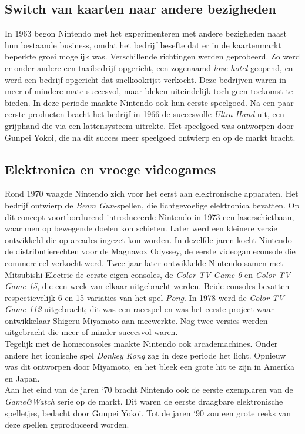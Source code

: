 \documentclass{article}
\begin{document}
\subsection{Switch van kaarten naar andere bezigheden}
In 1963 begon Nintendo met het experimenteren met andere bezigheden naast hun bestaande business, omdat het bedrijf besefte dat er in de kaartenmarkt beperkte groei mogelijk was. Verschillende richtingen werden geprobeerd. Zo werd er onder andere een taxibedrijf opgericht, een zogenaamd \textit{love hotel} geopend, en werd een bedrijf opgericht dat snelkookrijst verkocht. Deze bedrijven waren in meer of mindere mate succesvol, maar bleken uiteindelijk toch geen toekomst te bieden. 
In deze periode maakte Nintendo ook hun eerste speelgoed. Na een paar eerste producten bracht het bedrijf in 1966 de succesvolle \textit{Ultra-Hand} uit, een grijphand die via een lattensysteem uitrekte. Het speelgoed was ontworpen door Gunpei Yokoi, die na dit succes meer speelgoed ontwierp en op de markt bracht.
\subsection{Elektronica en vroege videogames}
Rond 1970 waagde Nintendo zich voor het eerst aan elektronische apparaten. Het bedrijf ontwierp de \textit{Beam Gun}-spellen, die lichtgevoelige elektronica bevatten. Op dit concept voortbordurend introduceerde Nintendo in 1973 een laserschietbaan, waar men op bewegende doelen kon schieten. Later werd een kleinere versie ontwikkeld die op arcades ingezet kon worden.
In dezelfde jaren kocht Nintendo de distributierechten voor de Magnavox Odyssey, de eerste videogameconsole die commercieel verkocht werd. Twee jaar later ontwikkelde Nintendo samen met Mitsubishi Electric de eerste eigen consoles, de \textit{Color TV-Game 6} en \textit{Color TV-Game 15}, die een week van elkaar uitgebracht werden. Beide consoles bevatten respectievelijk 6 en 15 variaties van het spel \textit{Pong}. In 1978 werd de \textit{Color TV-Game 112} uitgebracht; dit was een racespel en was het eerste project waar ontwikkelaar Shigeru Miyamoto aan meewerkte. Nog twee versies werden uitgebracht die meer of minder succesvol waren. 
\\ 
Tegelijk met de homeconsoles maakte Nintendo ook arcademachines. Onder andere het iconische spel \textit{Donkey Kong} zag in deze periode het licht. Opnieuw was dit ontworpen door Miyamoto, en het bleek een grote hit te zijn in Amerika en Japan.
\\ 
Aan het eind van de jaren `70 bracht Nintendo ook de eerste exemplaren van de \textit{Game\&Watch} serie op de markt. Dit waren de eerste draagbare elektronische spelletjes, bedacht door Gunpei Yokoi. Tot de jaren `90 zou een grote reeks van deze spellen geproduceerd worden.
\end{document}
